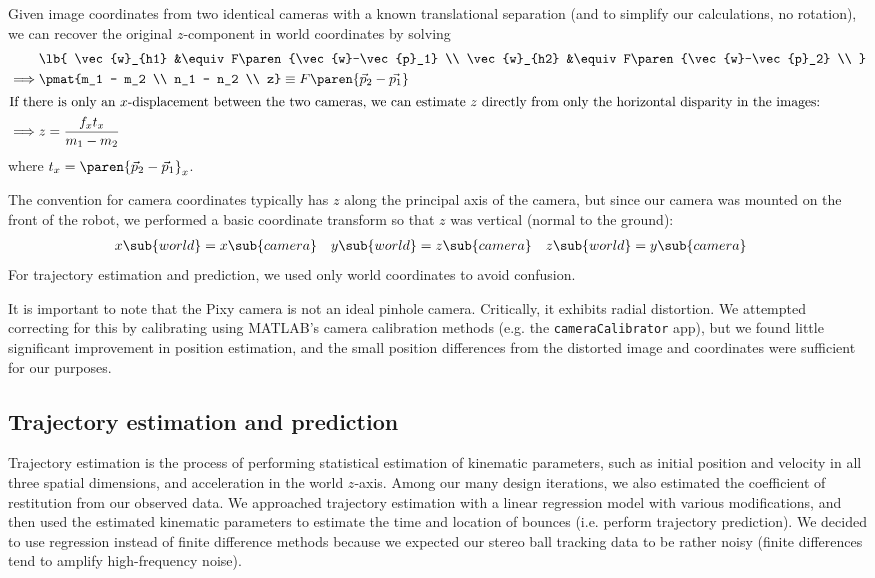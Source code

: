 \documentclass[letterpaper, 11pt]{article}
\renewcommand{\v}[1]{\vec{#1}}
\begin{document}
\begin{enumerate}[label=\textbf{\arabic*.}]
Given image coordinates from two identical cameras with a known translational separation (and to simplify our calculations, no rotation), we can recover the original $z$-component in world coordinates by solving
\begin{align*}
    &\lb{
        \v{w}_{h1} &\equiv F\paren{\v{w}-\v{p}_1} \\
        \v{w}_{h2} &\equiv F\paren{\v{w}-\v{p}_2} \\
    } \\
    \implies &\pmat{m_1 - m_2 \\ n_1 - n_2 \\ z} \equiv F\paren{\v{p}_2 - \v{p_1}} \\
    \intertext{If there is only an $x$-displacement between the two cameras, we can estimate $z$ directly from only the horizontal disparity in the images:}
    \implies &z = \frac{f_x t_x}{m_1 - m_2}
\end{align*}
where $t_x = \paren{\v{p}_{2} - \v{p}_{1}}_x$.

The convention for camera coordinates typically has $z$ along the principal axis of the camera, but since our camera was mounted on the front of the robot, we performed a basic coordinate transform so that $z$ was vertical (normal to the ground):
\begin{align*}
    x\sub{world} &= x\sub{camera} & y\sub{world} &= z\sub{camera} & z\sub{world} &= y\sub{camera}
\end{align*}
For trajectory estimation and prediction, we used only world coordinates to avoid confusion.

It is important to note that the Pixy camera is not an ideal pinhole camera. Critically, it exhibits radial distortion. We attempted correcting for this by calibrating using MATLAB's camera calibration methods (e.g. the \verb|cameraCalibrator| app), but we found little significant improvement in position estimation, and the small position differences from the distorted image and coordinates were sufficient for our purposes.

\subsection{Trajectory estimation and prediction}
Trajectory estimation is the process of performing statistical estimation of kinematic parameters, such as initial position and velocity in all three spatial dimensions, and acceleration in the world $z$-axis. Among our many design iterations, we also estimated the coefficient of restitution from our observed data. We approached trajectory estimation with a linear regression model with various modifications, and then used the estimated kinematic parameters to estimate the time and location of bounces (i.e. perform trajectory prediction). We decided to use regression instead of finite difference methods because we expected our stereo ball tracking data to be rather noisy (finite differences tend to amplify high-frequency noise).


\end{enumerate}
\end{document}

